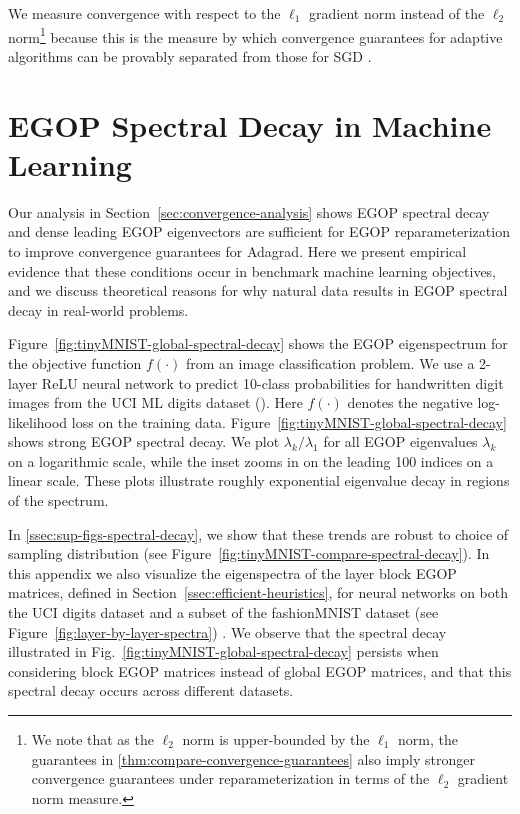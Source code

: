 \documentclass{article}
\begin{document}
We measure convergence with respect to the $\ell_1$ gradient norm instead of the $\ell_2$ norm\footnote{We note that as the $\ell_2$ norm is upper-bounded by the $\ell_1$ norm, the guarantees in \cref{thm:compare-convergence-guarantees} also imply stronger convergence guarantees under reparameterization in terms of the $\ell_2$ gradient norm measure.} because this is the measure by which convergence guarantees for adaptive algorithms can be provably separated from those for SGD \cite{jiang2024convergence}. 


\section{EGOP Spectral Decay in Machine Learning}\label{sec:EGOP-spectral-decay}

    Our analysis in Section~\ref{sec:convergence-analysis} shows EGOP spectral decay and dense leading EGOP eigenvectors are sufficient for EGOP reparameterization to improve convergence guarantees for Adagrad. Here we present empirical evidence that these conditions occur in benchmark machine learning objectives, and we discuss theoretical reasons for why natural data results in EGOP spectral decay in real-world problems.

    Figure~\ref{fig:tinyMNIST-global-spectral-decay} shows the EGOP eigenspectrum for the objective function $f(\cdot)$ from an image classification problem. We use a 2-layer ReLU neural network to predict 10-class probabilities for handwritten digit images from the UCI ML digits dataset (\citet{optical_recognition_of_handwritten_digits_80}). Here $f(\cdot)$ denotes the negative log-likelihood loss on the training data. Figure~\ref{fig:tinyMNIST-global-spectral-decay} shows strong EGOP spectral decay. We plot $\lambda_k/\lambda_1$ for all EGOP eigenvalues $\lambda_k$ on a logarithmic scale, while the inset zooms in on the leading 100 indices on a linear scale. These plots illustrate roughly exponential eigenvalue decay in regions of the spectrum.
    
    In \cref{ssec:sup-figs-spectral-decay}, we show that these trends are robust to choice of sampling distribution (see Figure~\ref{fig:tinyMNIST-compare-spectral-decay}). In this appendix we also visualize the eigenspectra of the layer block EGOP matrices, defined in Section~\ref{ssec:efficient-heuristics}, for neural networks on both the UCI digits dataset and a subset of the fashionMNIST dataset (see Figure~\ref{fig:layer-by-layer-spectra}) \cite{optical_recognition_of_handwritten_digits_80, xiao2017fashion}. We observe that the spectral decay illustrated in Fig.~\ref{fig:tinyMNIST-global-spectral-decay} persists when considering block EGOP matrices instead of global EGOP matrices, and that this spectral decay occurs across different datasets.
\end{document}
